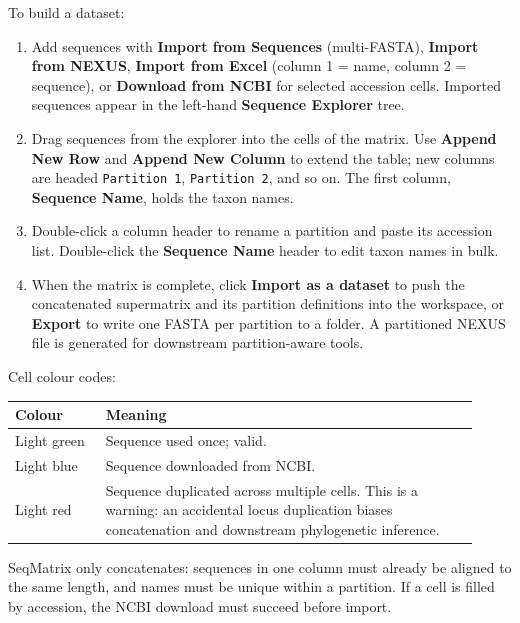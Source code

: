 \documentclass[10pt]{report}
\begin{document}
To build a dataset:

\begin{enumerate}
  \item Add sequences with \textbf{Import from Sequences} (multi-FASTA),
        \textbf{Import from NEXUS}, \textbf{Import from Excel} (column 1 =
        name, column 2 = sequence), or \textbf{Download from NCBI} for selected
        accession cells. Imported sequences appear in the left-hand
        \textbf{Sequence Explorer} tree.
  \item Drag sequences from the explorer into the cells of the matrix. Use
        \textbf{Append New Row} and \textbf{Append New Column} to extend the
        table; new columns are headed \texttt{Partition 1},
        \texttt{Partition 2}, and so on. The first column, \textbf{Sequence
        Name}, holds the taxon names.
  \item Double-click a column header to rename a partition and paste its
        accession list. Double-click the \textbf{Sequence Name} header to edit
        taxon names in bulk.
  \item When the matrix is complete, click \textbf{Import as a dataset} to
        push the concatenated supermatrix and its partition definitions into
        the workspace, or \textbf{Export} to write one FASTA per partition to
        a folder. A partitioned NEXUS file is generated for downstream
        partition-aware tools.
\end{enumerate}

Cell colour codes:

\begin{longtable}{@{}>{\raggedright\arraybackslash}p{0.18\linewidth}
                      >{\raggedright\arraybackslash}p{0.74\linewidth}@{}}
\toprule
Colour & Meaning \\
\midrule
\endhead
Light green & Sequence used once; valid. \\
Light blue & Sequence downloaded from NCBI. \\
Light red & Sequence duplicated across multiple cells. This is a warning: an
accidental locus duplication biases concatenation and downstream phylogenetic
inference. \\
\bottomrule
\end{longtable}

SeqMatrix only concatenates: sequences in one column must already be aligned
to the same length, and names must be unique within a partition. If a cell is
filled by accession, the NCBI download must succeed before import.
\end{document}
